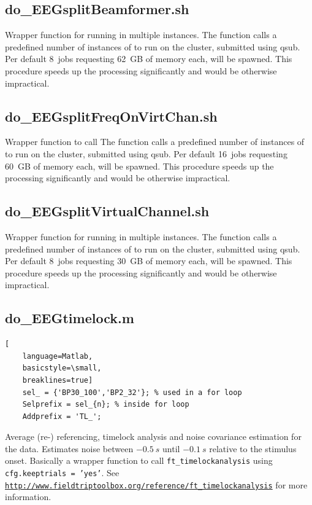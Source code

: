 \documentclass[12pt,a4paper]{scrartcl}
\begin{document}
\subsection{do\_EEGsplitBeamformer.sh}
\label{sh:splitbeamf}
Wrapper function for running \texttt{} in multiple instances. The function calls a predefined number of instances of \texttt{} to run on the cluster, submitted using qsub. Per default 8~jobs requesting 62~GB of memory each, will be spawned. This procedure speeds up the processing significantly and would be otherwise impractical.\\

\subsection{do\_EEGsplitFreqOnVirtChan.sh}
\label{sh:splitfreqVirt}
Wrapper function to call \texttt{} The function calls a predefined number of instances of \texttt{} to run on the cluster, submitted using qsub. Per default 16~jobs requesting 60~GB of memory each, will be spawned. This procedure speeds up the processing significantly and would be otherwise impractical.\\

\subsection{do\_EEGsplitVirtualChannel.sh}
\label{sh:splitvirtch}
Wrapper function for running \texttt{} in multiple instances. The function calls a predefined number of instances of \texttt{} to run on the cluster, submitted using qsub. Per default 8~jobs requesting 30~GB of memory each, will be spawned. This procedure speeds up the processing significantly and would be otherwise impractical.\\

\subsection{do\_EEGtimelock.m}
\label{m:timelock}
\begin{lstlisting}[
    language=Matlab,
    basicstyle=\small,
    breaklines=true]
    sel_ = {'BP30_100','BP2_32'}; % used in a for loop
    Selprefix = sel_{n}; % inside for loop
    Addprefix = 'TL_';
\end{lstlisting}
Average (re-) referencing, timelock analysis and noise covariance estimation for the data. Estimates noise between $-0.5~s$ until $-0.1~s$ relative to the stimulus onset. Basically a wrapper function to call \texttt{ft\_timelockanalysis} using \texttt{cfg.keeptrials = 'yes'}. See \href{http://www.fieldtriptoolbox.org/reference/ft\_timelockanalysis}{\nolinkurl{http://www.fieldtriptoolbox.org/reference/ft\_timelockanalysis}} for more information.\\
\end{document}
